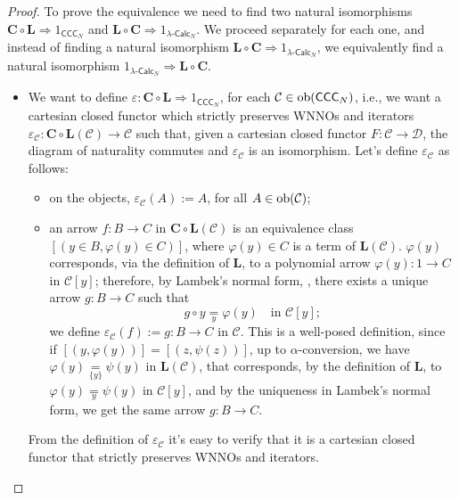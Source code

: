 \begin{proof}
    To prove the equivalence we need to find two natural isomorphisms $\mathbf C \circ \mathbf L \Rightarrow 1_{\mathsf{CCC}_N}$ and $\mathbf L \circ \mathbf C \Rightarrow 1_{\lambda\text{-}\mathsf{Calc}_N}$.
    We proceed separately for each one, and instead of finding a natural isomorphism $\mathbf L \circ \mathbf C \Rightarrow 1_{\lambda\text{-}\mathsf{Calc}_N}$, we equivalently find a natural isomorphism $1_{\lambda\text{-}\mathsf{Calc}_N} \Rightarrow \mathbf L \circ \mathbf C$.
    \begin{itemize}
        \item[$\boxed{\mathbf C \circ \mathbf L \Rightarrow 1_{\mathsf{CCC}_N}}$] We want to define $\varepsilon : \mathbf C \circ \mathbf L \Rightarrow 1_{\mathsf{CCC}_N}$, for each $\mathcal C \in \operatorname{ob}(\mathsf{CCC}_N)$, i.e.,
        we want a cartesian closed functor which strictly preserves WNNOs and iterators $\varepsilon_\mathcal C : \mathbf C \circ \mathbf L(\mathcal C) \to \mathcal C$ such that, given a cartesian closed functor $F : \mathcal C \to \mathcal D$, the diagram of naturality commutes and $\varepsilon_\mathcal C$ is an isomorphism.
        Let's define $\varepsilon_\mathcal C$ as follows:
        \begin{itemize}
            \item on the objects, $\varepsilon_\mathcal C(A) := A$, for all $A \in \operatorname{ob}(\mathcal C)$;
            \item an arrow $f : B \to C$ in $\mathbf C \circ \mathbf L(\mathcal C)$ is an equivalence class $[(y \in B,\varphi(y) \in C)]$, where $\varphi(y) \in C$ is a term of $\mathbf L(\mathcal C)$. $\varphi(y)$ corresponds, via the definition of $\mathbf L$,
            to a polynomial arrow $\varphi(y) : 1 \to C$ in $\mathcal C[y]$; therefore, by Lambek's normal form, , there exists a unique arrow $g : B \to C$ such that
            \[ g \circ y \underset{y}{=} \varphi(y) \quad \text{in } \mathcal C[y]; \]
            we define $\varepsilon_\mathcal C(f) := g : B \to C$ in $\mathcal C$. This is a well-posed definition, since if $[(y,\varphi(y))] = [(z,\psi(z))]$, up to $\alpha$-conversion, we have $\varphi(y) \underset{\{y\}}{=} \psi(y)$ in $\mathbf L(\mathcal C)$,
            that corresponds, by the definition of $\mathbf L$, to $\varphi(y) \underset{y}{=} \psi(y)$ in $\mathcal C[y]$, and by the uniqueness in Lambek's normal form, we get the same arrow $g : B \to C$.
        \end{itemize}
        From the definition of $\varepsilon_\mathcal C$ it's easy to verify that it is a cartesian closed functor that strictly preserves WNNOs and iterators.

\end{itemize}
\end{proof}
